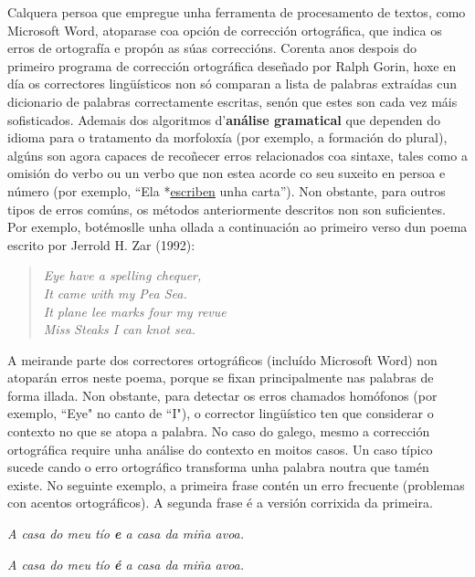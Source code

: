 \begin{multicols}{2}
Calquera persoa que empregue unha ferramenta de procesamento de textos, como Microsoft Word, atoparase coa opción de corrección ortográfica, que indica os erros de ortografía e propón as súas correccións. Corenta anos despois do primeiro programa de corrección ortográfica deseñado por Ralph Gorin, hoxe en día os correctores lingüísticos non só comparan a lista de palabras extraídas cun dicionario de palabras correctamente escritas, senón que estes son cada vez máis sofisticados. Ademais dos algoritmos d'\textbf{análise gramatical} que dependen do idioma para o tratamento da morfoloxía (por exemplo, a formación do plural), algúns son agora capaces de recoñecer erros relacionados coa sintaxe, tales como a omisión do verbo ou un verbo que non estea acorde co seu suxeito en persoa e número (por exemplo, “Ela *\underline{escriben} unha carta”). Non obstante, para outros tipos de erros comúns, os métodos anteriormente descritos non son suficientes. Por exemplo, botémoslle unha ollada a continuación ao primeiro verso dun poema escrito por Jerrold H. Zar (1992): 

\begin{verse}
\textit{Eye have a spelling chequer,} \\
\textit{It came with my Pea Sea.} \\
\textit{It plane lee marks four my revue} \\
\textit{Miss Steaks I can knot sea.} 
\end{verse}

A meirande parte dos correctores ortográficos (incluído Microsoft Word) non atoparán erros neste poema, porque se fixan principalmente nas palabras de forma illada. Non obstante, para detectar os erros chamados homófonos (por exemplo, “Eye" no canto de “I"), o corrector lingüístico ten que considerar o contexto no que se atopa a palabra. No caso do galego, mesmo a corrección ortográfica require unha análise do contexto en moitos casos. Un caso típico sucede cando o erro ortográfico transforma unha palabra noutra que tamén existe. No seguinte exemplo, a primeira frase contén un erro frecuente (problemas con acentos ortográficos). A segunda frase é a versión corrixida da primeira.

\textit{A casa do meu tío \textbf{e} a casa da miña avoa.}

\textit{A casa do meu tío \textbf{é} a casa da miña avoa.} 
 

\end{multicols}

